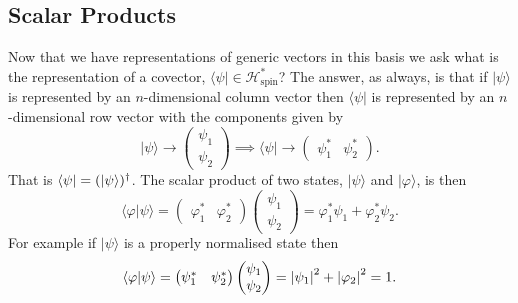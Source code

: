 \documentclass[a4paper]{article}
\renewcommand{\ket}[1]{\vert {#1} \rangle}
\renewcommand{\bra}[1]{\langle {#1} \vert}
\renewcommand{\braket}[2]{\langle {#1} \vert {#2} \rangle}
\newcommand{\hilbert}{\mathcal{H}}
\newcommand{\representation}{\mathbin{\rightarrow}}
\theoremstyle{definition}
\begin{document}
    \subsection{Scalar Products}
    Now that we have representations of generic vectors in this basis we ask what is the representation of a covector, \(\bra{\psi}\in\hilbert_{\text{spin}}^*\)?
    The answer, as always, is that if \(\ket{\psi}\) is represented by an \(n\)-dimensional column vector then \(\bra{\psi}\) is represented by an \(n\)-dimensional row vector with the components given by
    \[
        \ket{\psi} \representation 
        \begin{pmatrix}
            \psi_1\\ \psi_2
        \end{pmatrix}
        \implies
        \bra{\psi} \representation
        \begin{pmatrix}
            \psi_1^* & \psi_2^*
        \end{pmatrix}
        .
    \]
    That is \(\bra{\psi} = (\ket{\psi})\hermit\).
    The scalar product of two states, \(\ket{\psi}\) and \(\ket{\varphi}\), is then
    \[
        \braket{\varphi}{\psi} =
        \begin{pmatrix}
            \varphi_1^* & \varphi_2^*
        \end{pmatrix}
        \begin{pmatrix}
            \psi_1\\ \psi_2
        \end{pmatrix}
        = \varphi_1^*\psi_1 + \varphi_2^*\psi_2.
    \]
    For example if \(\ket{\psi}\) is a properly normalised state then
    \[
        \braket{\varphi}{\psi} =
        \begin{pmatrix}
            \psi_1^* & \psi_2^*
        \end{pmatrix}
        \begin{pmatrix}
            \psi_1\\ \psi_2
        \end{pmatrix}
        = \abs{\psi_1}^2 + \abs{\varphi_2}^2  = 1.
    \]
    
\end{document}
